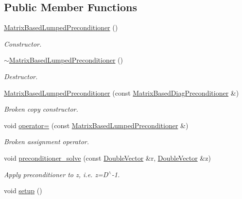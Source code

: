 \subsection*{Public Member Functions}
\begin{DoxyCompactItemize}
\item 
\hyperlink{classoomph_1_1MatrixBasedLumpedPreconditioner_acb1391dde15de1c6fc82b6462d1a027f}{Matrix\+Based\+Lumped\+Preconditioner} ()
\begin{DoxyCompactList}\small\item\em Constructor. \end{DoxyCompactList}\item 
\hyperlink{classoomph_1_1MatrixBasedLumpedPreconditioner_a1db36c78089a01b009fa5f26cf84d8a4}{$\sim$\+Matrix\+Based\+Lumped\+Preconditioner} ()
\begin{DoxyCompactList}\small\item\em Destructor. \end{DoxyCompactList}\item 
\hyperlink{classoomph_1_1MatrixBasedLumpedPreconditioner_a452ee712d3821b917c4771b8fe7d055d}{Matrix\+Based\+Lumped\+Preconditioner} (const \hyperlink{classoomph_1_1MatrixBasedDiagPreconditioner}{Matrix\+Based\+Diag\+Preconditioner} \&)
\begin{DoxyCompactList}\small\item\em Broken copy constructor. \end{DoxyCompactList}\item 
void \hyperlink{classoomph_1_1MatrixBasedLumpedPreconditioner_a38e5a8816b34c3fce86a441d6df1c33f}{operator=} (const \hyperlink{classoomph_1_1MatrixBasedLumpedPreconditioner}{Matrix\+Based\+Lumped\+Preconditioner} \&)
\begin{DoxyCompactList}\small\item\em Broken assignment operator. \end{DoxyCompactList}\item 
void \hyperlink{classoomph_1_1MatrixBasedLumpedPreconditioner_a48a9cbf7b1a6afbe60b050de87ec8047}{preconditioner\+\_\+solve} (const \hyperlink{classoomph_1_1DoubleVector}{Double\+Vector} \&r, \hyperlink{classoomph_1_1DoubleVector}{Double\+Vector} \&z)
\begin{DoxyCompactList}\small\item\em Apply preconditioner to z, i.\+e. z=D$^\wedge$-\/1. \end{DoxyCompactList}\item 
void \hyperlink{classoomph_1_1MatrixBasedLumpedPreconditioner_a7fc9e4c0ef357cbbc421a5fb37076edb}{setup} ()

\end{DoxyCompactItemize}
